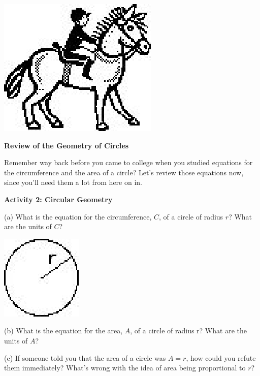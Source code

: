 \vspace{0.3cm}
{\par\raggedright \includegraphics{rotation/rotation_fig3.eps} \par}
\vspace{0.3cm}

\textbf{Review of the Geometry of Circles }

Remember way back before you came to college when you studied equations for
the circumference and the area of a circle? Let's review those equations now,
since you'll need them a lot from here on in.

\textbf{Activity 2: Circular Geometry} 

(a) What is the equation for the circumference, $C$, of a circle of radius $r$?
What are the units of $C$?

\vspace{0.3cm}
{\par\raggedright \includegraphics{rotation/rotation_fig4.eps} \par}
\vspace{0.3cm}

(b) What is the equation for the area, $A$, of a circle of radius r? What are
the units of $A$?
\vspace{10mm}

(c) If someone told you that the area of a circle was $A = r$, how could you refute
them immediately? What's wrong with the idea of area being proportional to $r$?
\vspace{20mm}

